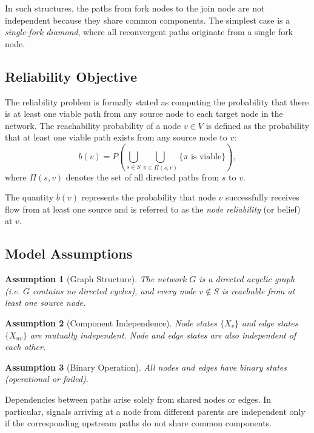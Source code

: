 \documentclass[preprint,12pt]{elsarticle}
\newtheorem{assumption}{Assumption}[section]
\begin{document}
In such structures, the paths from fork nodes to the join node are not independent because they share common components. The simplest case is a \emph{single-fork diamond}, where all reconvergent paths originate from a single fork node.

\subsection{Reliability Objective}

The reliability problem is formally stated as computing the probability that there is at least one viable path from any source node to each target node in the network. The reachability probability of a node $v \in V$ is defined as the probability that at least one viable path exists from any source node to $v$:
\begin{equation}
b(v) = P\left( \bigcup_{s \in S} \bigcup_{\pi \in \Pi(s,v)} 
\{\pi \text{ is viable}\} \right),
\end{equation}
where $\Pi(s,v)$ denotes the set of all directed paths from $s$ to $v$.

The quantity $b(v)$ represents the probability that node $v$ successfully receives flow from at least one source and is referred to as the 
\emph{node reliability} (or belief) at $v$.


\subsection{Model Assumptions}

\begin{assumption}[Graph Structure]
The network $G$ is a directed acyclic graph (i.e. $G$ contains no directed cycles), and every node $v \notin S$ is reachable from at least one source node.
\end{assumption}

\begin{assumption}[Component Independence]
Node states $\{X_v\}$ and edge states $\{X_{uv}\}$ are mutually independent. Node and edge states are also independent of each other.
\end{assumption}

\begin{assumption}[Binary Operation]
All nodes and edges have binary states (operational or failed).
\end{assumption}

Dependencies between paths arise solely from shared nodes or edges. In particular, signals arriving at a node from different parents are independent only if the corresponding upstream paths do not share common components. 
\end{document}
